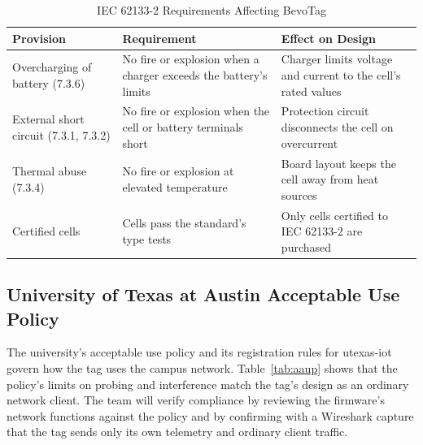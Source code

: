 \documentclass[12pt,letterpaper]{article}
\newenvironment{spectable}{\setstretch{1.0}\renewcommand{\arraystretch}{1.1}}{}
\begin{document}
\begin{table}[H]
\caption{IEC 62133-2 Requirements Affecting BevoTag}
\label{tab:aiec}
\centering
\begin{spectable}
\begin{tabularx}{\linewidth}{@{}L{1.7in} Y Y@{}}
\toprule
\textbf{Provision} & \textbf{Requirement} & \textbf{Effect on Design} \\
\midrule
Overcharging of battery (7.3.6) \cite{iec62133} & No fire or explosion when a charger exceeds the battery's limits & Charger limits voltage and current to the cell's rated values \\
External short circuit (7.3.1, 7.3.2) \cite{iec62133} & No fire or explosion when the cell or battery terminals short & Protection circuit disconnects the cell on overcurrent \\
Thermal abuse (7.3.4) \cite{iec62133} & No fire or explosion at elevated temperature & Board layout keeps the cell away from heat sources \\
Certified cells \cite{iec62133} & Cells pass the standard's type tests & Only cells certified to IEC 62133-2 are purchased \\
\bottomrule
\end{tabularx}
\end{spectable}
\end{table}

\subsection{University of Texas at Austin Acceptable Use Policy}
The university's acceptable use policy \cite{utaup} and its registration rules for utexas-iot
\cite{utiot} govern how the tag uses the campus network. Table~\ref{tab:aaup}
shows that the policy's limits on probing and interference match the tag's design as an ordinary
network client. The team will verify compliance by reviewing the firmware's network functions
against the policy and by confirming with a Wireshark capture that the tag sends only its own
telemetry and ordinary client traffic.
\end{document}
